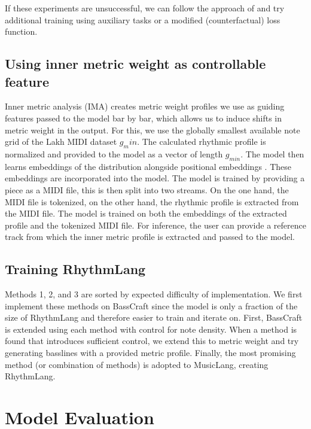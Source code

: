 If these experiments are unsuccessful, we can follow the approach of \cite{Shu_Xu_Musebarcontrol_2024} and try additional training using auxiliary tasks or a modified (counterfactual) loss function. 

\subsection{Using inner metric weight as controllable feature}
Inner metric analysis (IMA) creates metric weight profiles we use as guiding features passed to the model bar by bar, which allows us to induce shifts in metric weight in the output. 
For this, we use the globally smallest available note grid of the Lakh MIDI dataset $g_min$. The calculated rhythmic profile is normalized and provided to the model as a vector of length $g_{min}$. 
The model then learns embeddings of the distribution alongside positional embeddings \cite{Lin_cocomulla_2024}. These embeddings are incorporated into the model. 
The model is trained by providing a piece as a MIDI file, this is then split into two streams. On the one hand, the MIDI file is tokenized, on the other hand, the rhythmic profile is extracted from the MIDI file. The model is trained on both the embeddings of the extracted profile and the tokenized MIDI file. 
For inference, the user can provide a reference track from which the inner metric profile is extracted and passed to the model. 

\subsection{Training RhythmLang}
Methods 1, 2, and 3 are sorted by expected difficulty of implementation. We first implement these methods on BassCraft since the model is only a fraction of the size of RhythmLang and therefore easier to train and iterate on. First, BassCraft is extended using each method with control for note density. When a method is found that introduces sufficient control, we extend this to metric weight and try generating basslines with a provided metric profile. Finally, the most promising method (or combination of methods) is adopted to MusicLang, creating RhythmLang.


\section{Model Evaluation}
